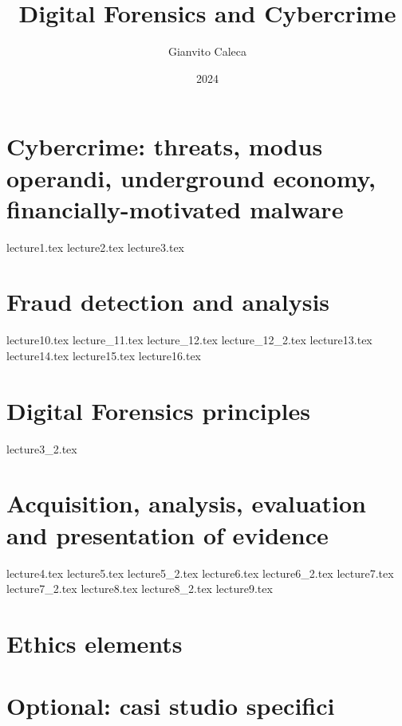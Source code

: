 \documentclass{report}
\title{Digital Forensics and Cybercrime}
\date{2024}
\author{Gianvito Caleca}
\begin{document}
\maketitle
\tableofcontents
\part{Cybercrime: threats, modus operandi, underground economy, financially-motivated malware}
{lecture1.tex}
{lecture2.tex}
{lecture3.tex}
\part{Fraud detection and analysis}
{lecture10.tex}
{lecture_11.tex}
{lecture_12.tex}
{lecture_12_2.tex}
{lecture13.tex}
{lecture14.tex}
{lecture15.tex}
{lecture16.tex}
\part{Digital Forensics principles}
{lecture3_2.tex}
\part{Acquisition, analysis, evaluation and presentation of evidence}
{lecture4.tex}
{lecture5.tex}
{lecture5_2.tex}
{lecture6.tex}
{lecture6_2.tex}
{lecture7.tex}
{lecture7_2.tex}
{lecture8.tex}
{lecture8_2.tex}
{lecture9.tex}
\part{Ethics elements}
\part{Optional: casi studio specifici}
\end{document}
